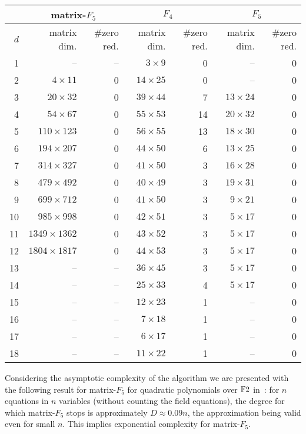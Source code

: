 \begin{center}
\begin{tabular}{|r|r|r|r|r|r|r|}
\hline
    & \multicolumn{2}{|c|}{matrix-$F_5$} & \multicolumn{2}{|c|}{$F_4$} & \multicolumn{2}{|c|}{$F_{5}$}\\
\hline
$d$ & matrix dim. & \#zero red.& matrix dim. & \#zero red.& matrix dim. & \#zero red.\\
\hline
 1&               -- &--&$ 3 \times  9$&  0&             --& 0\\
 2&$   4\times   11$ & 0&$14 \times 25$&  0&             --& 0\\
 3&$  20\times   32$ & 0&$39 \times 44$&  7& $13 \times 24$& 0\\
 4&$  54\times   67$ & 0&$55 \times 53$& 14& $20 \times 32$& 0\\
 5&$ 110\times  123$ & 0&$56 \times 55$& 13& $18 \times 30$& 0\\
 6&$ 194\times  207$ & 0&$44 \times 50$&  6& $13 \times 25$& 0\\
 7&$ 314\times  327$ & 0&$41 \times 50$&  3& $16 \times 28$& 0\\
 8&$ 479\times  492$ & 0&$40 \times 49$&  3& $19 \times 31$& 0\\
 9&$ 699\times  712$ & 0&$41 \times 50$&  3& $ 9 \times 21$& 0\\
10&$ 985\times  998$ & 0&$42 \times 51$&  3& $ 5 \times 17$& 0\\
11&$1349\times 1362$ & 0&$43 \times 52$&  3& $ 5 \times 17$& 0\\
12&$1804\times 1817$ & 0&$44 \times 53$&  3& $ 5 \times 17$& 0\\
13&               -- &--&$36 \times 45$&  3& $ 5 \times 17$& 0\\
14&               -- &--&$25 \times 33$&  4& $ 5 \times 17$& 0\\
15&               -- &--&$12 \times 23$&  1&            -- & 0\\
16&               -- &--&$ 7 \times 18$&  1&            -- & 0\\
17&               -- &--&$ 6 \times 17$&  1&            -- & 0\\
18&               -- &--&$11 \times 22$&  1&            -- & 0\\
\hline
\end{tabular}
\end{center}

Considering the asymptotic complexity of the algorithm we are presented with the following result for matrix-$F_5$ for quadratic polynomials over $\mathbb{F}{2}$ in~\cite{bardet-faugere-salvy:tech}: for $n$ equations in $n$ variables (without counting the field equations), the degree for which matrix-$F_5$ stops is approximately $D\approx 0.09n$, the approximation being valid even for small $n$. This implies exponential complexity for matrix-$F_5$.

